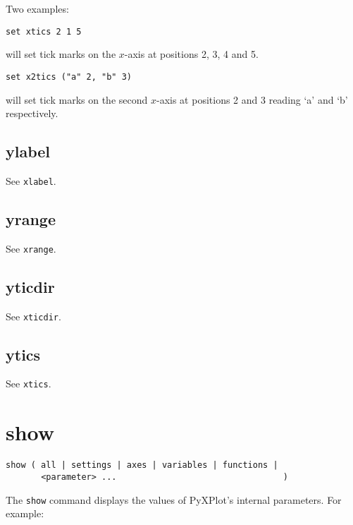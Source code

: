 \documentclass[a4paper,onecolumn,11pt]{book}
\begin{document}
Two examples:

\begin{verbatim}
set xtics 2 1 5
\end{verbatim}

\noindent will set tick marks on the $x$-axis at positions 2, 3, 4 and 5.

\begin{verbatim}
set x2tics ("a" 2, "b" 3)
\end{verbatim}

\noindent will set tick marks on the second $x$-axis at positions 2 and 3 reading `a' and
`b' respectively.


\subsection{ylabel}

See {\tt xlabel}.


\subsection{yrange}

See {\tt xrange}.
   

\subsection{yticdir}

See {\tt xticdir}.


\subsection{ytics}

See {\tt xtics}.

\section{show}

\begin{verbatim}
show ( all | settings | axes | variables | functions |
       <parameter> ...                                 )
\end{verbatim}

The {\tt show} command displays the values of PyXPlot's internal parameters. For
example:
\end{document}
